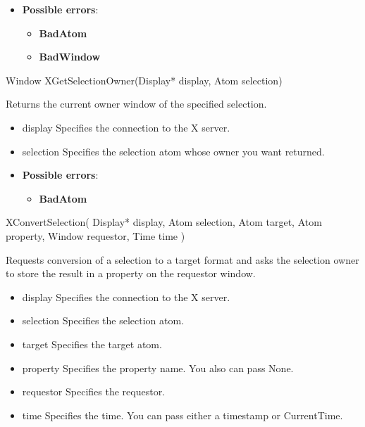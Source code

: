 \documentclass{report}
\begin{document}
\begin{itemize}
            \begin{itemize}
                \item \textbf{Possible errors}:
                    \begin{itemize}
                        \item \textbf{BadAtom}
                        \item \textbf{BadWindow}
                    \end{itemize}
            \end{itemize}

            \begin{cppcode}
            Window XGetSelectionOwner(Display* display, Atom selection)
            \end{cppcode}
            \bigbreak \noindent
            Returns the current owner window of the specified selection.

            \begin{itemize}
                \item display Specifies the connection to the X server.
                \item selection Specifies the selection atom whose owner you want returned.
            \end{itemize}

            \begin{itemize}
                \item \textbf{Possible errors}:
                    \begin{itemize}
                        \item \textbf{BadAtom}
                    \end{itemize}
            \end{itemize}

            \begin{cppcode}
            XConvertSelection(
                Display* display,
                Atom selection,
                Atom target,
                Atom property,
                Window requestor,
                Time time
            )
            \end{cppcode}
            \bigbreak \noindent
            Requests conversion of a selection to a target format and asks the selection owner to store the result in a property on the requestor window.

            \begin{itemize}
                \item display Specifies the connection to the X server.
                \item selection Specifies the selection atom.
                \item target Specifies the target atom.
                \item property Specifies the property name. You also can pass None.
                \item requestor Specifies the requestor.
                \item time Specifies the time. You can pass either a timestamp or CurrentTime.
            \end{itemize}


\end{itemize}
\end{document}
